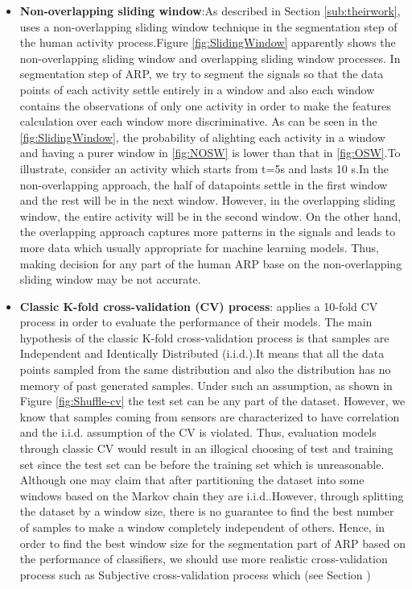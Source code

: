 \begin{itemize}
\item \textbf{Non-overlapping sliding window}:As described in Section \ref{sub:theirwork}, \cite{banos2014window} uses a non-overlapping sliding window technique in the segmentation step of the human activity process.Figure \ref{fig:SlidingWindow} apparently shows the non-overlapping sliding window and overlapping sliding window processes. In segmentation step of ARP, we try to segment the signals so that the data points of each activity settle entirely in a window and also each window contains the observations of only one activity in order to make the features calculation over each window more discriminative.
As can be seen in the \ref{fig:SlidingWindow}, the probability of alighting each activity in a window and having a purer window in \ref{fig:NOSW} is lower than that in \ref{fig:OSW}.To illustrate, consider an activity which starts from t=5s and lasts 10 s.In the non-overlapping approach, the half of datapoints settle in the first window and the rest will be in the next window. However, in the overlapping sliding window, the entire activity will be in the second window. On the other hand, the overlapping approach captures more patterns in the signals and leads to more data which usually appropriate for machine learning models. Thus, making decision for any part of the human ARP base on the non-overlapping sliding window may be not accurate.\newline


\item \textbf{Classic K-fold cross-validation (CV) process}:
\cite{banos2014window} applies a 10-fold CV process in order to evaluate the performance of their models.
The main hypothesis of the classic K-fold cross-validation process is that samples are Independent and Identically Distributed (i.i.d.).It means that all the data points sampled from the same distribution and also the distribution has no memory of past generated samples. Under such an assumption, as shown in Figure \ref{fig:Shuffle-cv} the test set can be any part of the dataset. However, we know that samples coming from sensors are characterized to have correlation and the i.i.d. assumption of the CV is violated. Thus, evaluation models through classic CV would result in an illogical choosing of test and training set since the test set can be before the training set which is unreasonable. Although one may claim that after partitioning the dataset into some windows based on the Markov chain \cite{gilks1995markov} they are i.i.d..However, through splitting the dataset by a window size, there is no guarantee to find the best number of samples to make a window completely independent of others. Hence, in order to find the best window size for the segmentation part of ARP based on the performance of classifiers, we should use more realistic cross-validation process such as Subjective cross-validation process which (see Section )


\end{itemize}
